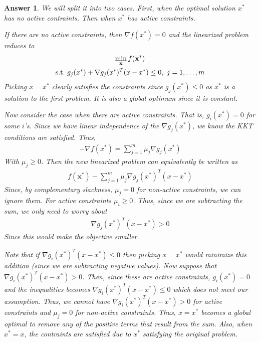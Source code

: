 \documentclass[12pt]{article}
\theoremstyle{colon}
\newtheorem*{answer}{Answer}
\begin{document}
\begin{answer}
  We will split it into two cases. First, when the optimal solution $x^*$ has no active contraints. Then when $x^*$ has active constraints.

  If there are no active constraints, then $\nabla f(x^*) = 0$ and the linearized problem reduces to
  \begin{gather*}
    \min_\textbf{x} f(\textbf{x}^*) \\
    \text{s.t.} \ g_j(x^*) + \nabla g_j(x^*)^T (x-x^*) \leq 0, \ j = 1, \mathellipsis, m
  \end{gather*}
  Picking $x = x^*$ clearly satisfies the constraints since $g_j(x^*) \leq 0$ as $x^*$ is a solution to the first problem. It is also a global optimum since it is constant.

  Now consider the case when there are active constraints. That is, $g_i(x^*) = 0$ for some $i$'s. Since we have linear independence of the $\nabla g_j(x^*)$, we know the KKT conditions are satisfied. Thus,
  \begin{gather*}
    -\nabla f(x^*) = \sum_{j=1}^m \mu_j \nabla g_j(x^*)
  \end{gather*}
  With $\mu_j \geq 0$. Then the new linearized problem can equivalently be written as
  \begin{gather*}
    f(\textbf{x}^*) - \sum_{j=1}^m \mu_j \nabla g_j(x^*)^T(x-x^*)
  \end{gather*}
  Since, by complementary slackness, $\mu_j = 0$ for non-active constraints, we can ignore them. For active constraints $\mu_i \geq 0$. Thus, since we are subtracting the sum, we only need to worry about
  \begin{gather*}
    \nabla g_j(x^*)^T(x-x^*) > 0
  \end{gather*}
  Since this would make the objective smaller.

  Note that if $\nabla g_i(x^*)^T(x-x^*) \leq 0$ then picking $x = x^*$ would minimize this addition (since we are subtracting negative values). Now suppose that $\nabla g_i(x^*)^T(x-x^*) > 0$. Then, since these are active constraints, $g_i(x^*) = 0$ and the inequalities becomes $\nabla g_i(x^*)^T (x-x^*) \leq 0$ which does not meet our assumption. Thus, we cannot have $\nabla g_i(x^*)^T(x-x^*) > 0$ for active constraints and $\mu_j = 0$ for non-active constraints. Thus, $x = x^*$ becomes a global optimal to remove any of the positive terms that result from the sum. Also, when $x^* = x$, the contraints are satisfied due to $x^*$ satisfying the original problem.
\end{answer}
\end{document}
